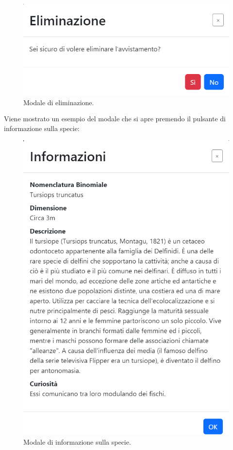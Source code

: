 \documentclass[a4paper,final,12pt]{report}
\begin{document}
\begin{figure}[hbtp]
\centering
\includegraphics[scale=0.80]{img_concettuale/eliminazione.png}
\caption{Modale di eliminazione.}
\end{figure}
\newpage
Viene mostrato un esempio del modale che si apre premendo il pulsante di informazione sulla specie:
\begin{figure}[hbtp]
\centering
\includegraphics[scale=0.65]{img_concettuale/info.png}
\caption{Modale di informazione sulla specie.}
\end{figure}
\end{document}
